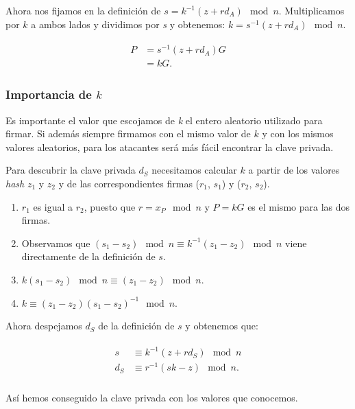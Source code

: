 \documentclass[11pt]{article}
\begin{document}
Ahora nos fijamos en la definición de $s = k^{-1}(z + r d_A) \mod n$. Multiplicamos por $k$ a ambos lados y dividimos por \textit{s} y obtenemos: $k = s^{-1} (z + r d_A) \mod n$.

\begin{align}
\begin{split}
P &= s^{-1}(z + r d_A) G\\
&= kG.
\end{split}
\end{align}


\subsubsection*{Importancia de $k$}

Es importante el valor que escojamos de \textit{k} el entero aleatorio utilizado para firmar. Si además siempre firmamos con el mismo valor de $k$ y con los mismos valores aleatorios, para los atacantes será más fácil encontrar la clave privada.

Para descubrir la clave privada $d_S$ necesitamos calcular $k$ a partir de los valores \textit{hash} $z_1$ y $z_2$ y de las correspondientes firmas ($r_1$, $s_1$) y ($r_2$, $s_2$).


\begin{enumerate}
	\item $r_1$ es igual a $r_2$, puesto que $ r = x_P \mod n$ y $P = kG$ es el mismo para las dos firmas.
	\item Observamos que  $(s_1 - s_2) \mod n \equiv k^{-1} (z_1 - z_2) \mod n$ viene directamente de la definición de $s$.
	\item $k(s_1 - s_2) \mod n \equiv (z_1 - z_2) \mod n$.
	\item $k  \equiv (z_1 - z_2) (s_1 -s_2)^{-1} \mod n$.
\end{enumerate}

Ahora despejamos $d_S$ de la definición de $s$ y obtenemos que:


\begin{align}
\begin{split}
s &\equiv k^{-1}(z + r d_S) \mod n\\
d_S &\equiv r^{-1}(sk - z) \mod n.\\
\end{split}
\end{align}

Así hemos conseguido la clave privada con los valores que conocemos.
\end{document}
